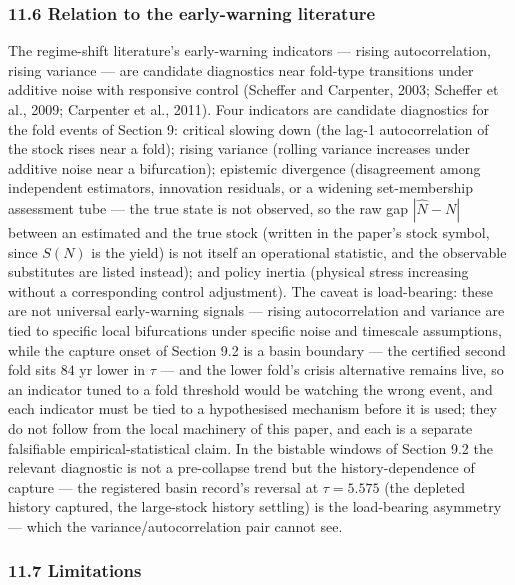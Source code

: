\documentclass[11pt]{article}
\begin{document}
\subsubsection{11.6 Relation to the early-warning
literature}\label{relation-to-the-early-warning-literature}

The regime-shift literature's early-warning indicators --- rising
autocorrelation, rising variance --- are candidate diagnostics near
fold-type transitions under additive noise with responsive control
(Scheffer and Carpenter, 2003; Scheffer et al., 2009; Carpenter et al.,
2011). Four indicators are candidate diagnostics for the fold events of
Section 9: critical slowing down (the lag-1 autocorrelation of the stock
rises near a fold); rising variance (rolling variance increases under
additive noise near a bifurcation); epistemic divergence (disagreement
among independent estimators, innovation residuals, or a widening
set-membership assessment tube --- the true state is not observed, so
the raw gap \(|\hat N - N|\) between an estimated and the true stock
(written in the paper's stock symbol, since \(S(N)\) is the yield) is
not itself an operational statistic, and the observable substitutes are
listed instead); and policy inertia (physical stress increasing without
a corresponding control adjustment). The caveat is load-bearing: these
are not universal early-warning signals --- rising autocorrelation and
variance are tied to specific local bifurcations under specific noise
and timescale assumptions, while the capture onset of Section 9.2 is a
basin boundary --- the certified second fold sits \(84\) yr lower in
\(\tau\) --- and the lower fold's crisis alternative remains live, so an
indicator tuned to a fold threshold would be watching the wrong event,
and each indicator must be tied to a hypothesised mechanism before it is
used; they do not follow from the local machinery of this paper, and
each is a separate falsifiable empirical-statistical claim. In the
bistable windows of Section 9.2 the relevant diagnostic is not a
pre-collapse trend but the history-dependence of capture --- the
registered basin record's reversal at \(\tau = 5.575\) (the depleted
history captured, the large-stock history settling) is the load-bearing
asymmetry --- which the variance/autocorrelation pair cannot see.

\subsubsection{11.7 Limitations}\label{limitations}
\end{document}
